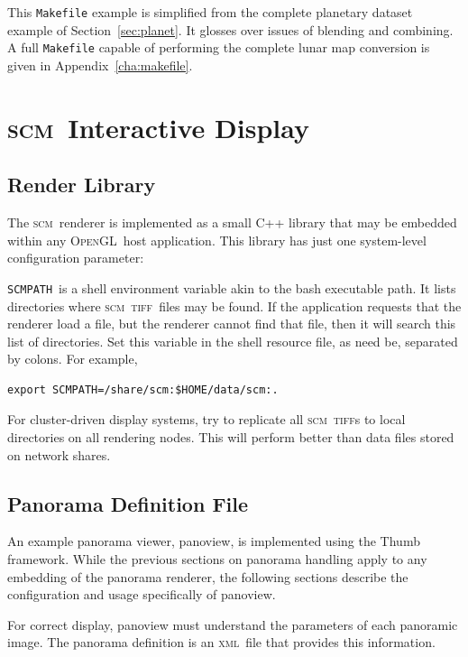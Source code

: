 \documentclass[oneside,10pt]{memoir}
\newcommand{\opengl}  {\textsc{OpenGL}}
\newcommand{\scm}     {\textsc{scm}}
\newcommand{\tiff}    {\textsc{tiff}}
\newcommand{\xml}     {\textsc{xml}}
\newcommand{\scmpath}{\texttt{SCMPATH}}
\begin{document}
\begin{Spacing}{1.1}
This \texttt{Makefile} example is simplified from the complete planetary dataset example of Section~\ref{sec:planet}. It glosses over issues of blending and combining. A full \texttt{Makefile} capable of performing the complete lunar map conversion is given in Appendix~\ref{cha:makefile}.


\chapter{\scm\ Interactive Display}

\section{Render Library}

The \scm\ renderer is implemented as a small C++ library that may be embedded within any \opengl\ host application. This library has just one system-level configuration parameter:

\scmpath\ is a shell environment variable akin to the bash executable path. It lists directories where \scm\ \tiff\ files may be found. If the application requests that the renderer load a file, but the renderer cannot find that file, then it will search this list of directories. Set this variable in the shell resource file, as need be, separated by colons. For example,

\begin{Verbatim}
export SCMPATH=/share/scm:$HOME/data/scm:.
\end{Verbatim}

For cluster-driven display systems, try to replicate all \scm\ \tiff s to local directories on all rendering nodes. This will perform better than data files stored on network shares.

\section{Panorama Definition File}

An example panorama viewer, panoview, is implemented using the Thumb framework. While the previous sections on panorama handling apply to any embedding of the panorama renderer, the following sections describe the configuration and usage specifically of panoview.

For correct display, panoview must understand the parameters of each panoramic image. The panorama definition is an \xml\ file that provides this information.


\end{Spacing}
\end{document}
